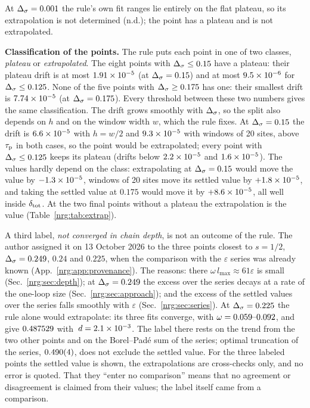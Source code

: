 At $\Delta_\sigma=0.001$ the rule's own fit ranges lie entirely on the flat plateau, so its extrapolation is not determined (n.d.); the point
has a plateau and is not extrapolated.

\textbf{Classification of the points.} The rule puts each point in one of two classes, \emph{plateau} or \emph{extrapolated}. The eight
points with $\Delta_\sigma\le0.15$ have a plateau: their plateau drift is at most $1.91\times10^{-5}$ (at $\Delta_\sigma=0.15$) and at
most $9.5\times10^{-6}$ for $\Delta_\sigma\le0.125$. None of the five points with $\Delta_\sigma\ge0.175$ has one: their smallest drift is
$7.74\times10^{-5}$ (at $\Delta_\sigma=0.175$). Every threshold between these two numbers gives the same classification.
The drift grows smoothly with $\Delta_\sigma$, so the split also depends on $h$ and on the window width $w$, which the rule fixes. At $\Delta_\sigma=0.15$
the drift is $6.6\times10^{-5}$ with $h=w/2$ and $9.3\times10^{-5}$ with windows of 20 sites, above $\tau_{\rm p}$ in both
cases, so the point would be extrapolated; every point with $\Delta_\sigma\le0.125$ keeps its plateau (drifts below $2.2\times10^{-5}$ and
$1.6\times10^{-5}$). The values hardly depend on the class: extrapolating at $\Delta_\sigma=0.15$ would move the value by $-1.3\times10^{-5}$,
windows of 20 sites move its settled value by $+1.8\times10^{-5}$, and taking the settled value at $0.175$ would move it by
$+8.6\times10^{-5}$, all well inside $\delta_{\rm tot}$. At the two final points without a plateau the extrapolation is the value
(Table~\ref{nrg:tab:extrap}).

A third label, \emph{not converged in chain depth}, is not an outcome of the rule. The author assigned it on 13 October 2026 to the
three points closest to $s=1/2$, $\Delta_\sigma=0.249$, $0.24$ and $0.225$, when the comparison with the $\varepsilon$ series was already known
(App.~\ref{nrg:app:provenance}). The reasons: there $\omega\,l_{\max}\approx61\varepsilon$ is small (Sec.~\ref{nrg:sec:depth}); at
$\Delta_\sigma=0.249$ the excess over the series decays at a rate of the one-loop size (Sec.~\ref{nrg:sec:approach}); and the excess of the settled
values over the series falls smoothly with $\varepsilon$ (Sec.~\ref{nrg:sec:series}). At $\Delta_\sigma=0.225$ the rule alone would extrapolate: its
three fits converge, with $\omega=0.059\text{--}0.092$, and give $0.487529$ with $\,d=2.1\times10^{-3}$.
The label there rests on the trend from the two other points and on the Borel--Pad\'e sum of the series; optimal truncation of the
series, $0.490(4)$, does not exclude the settled value. For the three labeled points the settled value is shown, the
extrapolations are cross-checks only, and no error is quoted. That they ``enter no comparison'' means that no agreement or
disagreement is claimed from their values; the label itself came from a comparison.

